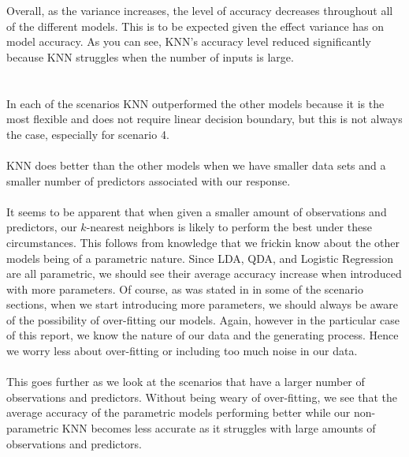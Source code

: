 \documentclass[11pt, oneside]{article}
\begin{document}
Overall, as the variance increases, the level of accuracy decreases throughout all of the different models. This is to be expected given the effect variance has on model accuracy.  As you can see, KNN’s accuracy level reduced significantly because KNN struggles when the number of inputs is large.\\
\\
\\
In each of the scenarios KNN outperformed the other models because it is the most flexible and does not require linear decision boundary, but this is not always the case, especially for scenario 4.\\
\\
KNN does better than the other models when we have smaller data sets and a smaller number of predictors associated with our response.\\
\\
It seems to be apparent that when given a smaller amount of observations and predictors, our $k$-nearest neighbors is likely to perform the best under these circumstances. This follows from knowledge that we frickin know about the other models being of a parametric nature. Since LDA, QDA, and Logistic Regression are all parametric, we should see their average accuracy increase when introduced with more parameters. Of course, as was stated in in some of the scenario sections, when we start introducing more parameters, we should always be aware of the possibility of over-fitting our models. Again, however in the particular case of this report, we know the nature of our data and the generating process. Hence we worry less about over-fitting or including too much noise in our data.\\
\\
This goes further as we look at the scenarios that have a larger number of observations and predictors. Without being weary of over-fitting, we see that the average accuracy of the parametric models performing better while our non-parametric KNN becomes less accurate as it struggles with large amounts of observations and predictors.\\
\\
\end{document}
